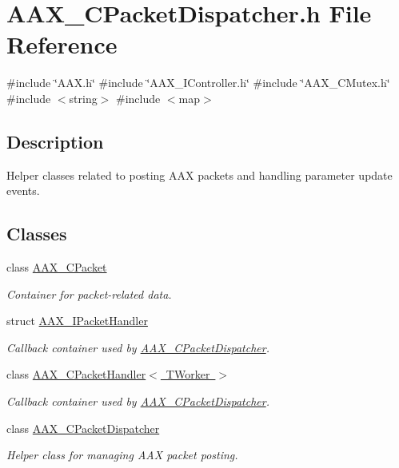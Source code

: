 \hypertarget{a00452}{}\section{A\+A\+X\+\_\+\+C\+Packet\+Dispatcher.\+h File Reference}
\label{a00452}
{\ttfamily \#include \char`\"{}A\+A\+X.\+h\char`\"{}}\newline
{\ttfamily \#include \char`\"{}A\+A\+X\+\_\+\+I\+Controller.\+h\char`\"{}}\newline
{\ttfamily \#include \char`\"{}A\+A\+X\+\_\+\+C\+Mutex.\+h\char`\"{}}\newline
{\ttfamily \#include $<$string$>$}\newline
{\ttfamily \#include $<$map$>$}\newline


\subsection{Description}
Helper classes related to posting A\+AX packets and handling parameter update events. 

\subsection*{Classes}
\begin{DoxyCompactItemize}
\item 
class \mbox{\hyperlink{a01513}{A\+A\+X\+\_\+\+C\+Packet}}
\begin{DoxyCompactList}\small\item\em Container for packet-\/related data. \end{DoxyCompactList}\item 
struct \mbox{\hyperlink{a01521}{A\+A\+X\+\_\+\+I\+Packet\+Handler}}
\begin{DoxyCompactList}\small\item\em Callback container used by \mbox{\hyperlink{a01529}{A\+A\+X\+\_\+\+C\+Packet\+Dispatcher}}. \end{DoxyCompactList}\item 
class \mbox{\hyperlink{a01525}{A\+A\+X\+\_\+\+C\+Packet\+Handler$<$ T\+Worker $>$}}
\begin{DoxyCompactList}\small\item\em Callback container used by \mbox{\hyperlink{a01529}{A\+A\+X\+\_\+\+C\+Packet\+Dispatcher}}. \end{DoxyCompactList}\item 
class \mbox{\hyperlink{a01529}{A\+A\+X\+\_\+\+C\+Packet\+Dispatcher}}
\begin{DoxyCompactList}\small\item\em Helper class for managing A\+AX packet posting. \end{DoxyCompactList}\end{DoxyCompactItemize}
